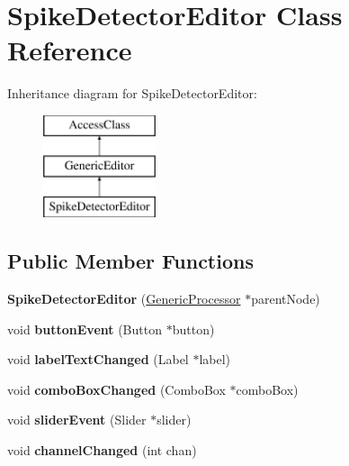 \hypertarget{classSpikeDetectorEditor}{\section{Spike\-Detector\-Editor Class Reference}
\label{classSpikeDetectorEditor}
}
Inheritance diagram for Spike\-Detector\-Editor\-:\begin{figure}[H]
\begin{center}
\leavevmode
\includegraphics[height=3.000000cm]{classSpikeDetectorEditor}
\end{center}
\end{figure}
\subsection*{Public Member Functions}
\begin{DoxyCompactItemize}
\item 
\hypertarget{classSpikeDetectorEditor_a5e291e45376684d6a7882962c9adbc1b}{{\bfseries Spike\-Detector\-Editor} (\hyperlink{classGenericProcessor}{Generic\-Processor} $\ast$parent\-Node)}\label{classSpikeDetectorEditor_a5e291e45376684d6a7882962c9adbc1b}

\item 
\hypertarget{classSpikeDetectorEditor_a3596a939b1842825ca19c7ba40c45214}{void {\bfseries button\-Event} (Button $\ast$button)}\label{classSpikeDetectorEditor_a3596a939b1842825ca19c7ba40c45214}

\item 
\hypertarget{classSpikeDetectorEditor_ae68515d9c025e06a5f8455a7afeed5bd}{void {\bfseries label\-Text\-Changed} (Label $\ast$label)}\label{classSpikeDetectorEditor_ae68515d9c025e06a5f8455a7afeed5bd}

\item 
\hypertarget{classSpikeDetectorEditor_aa989c11f9a1c54b9a8846512525fa756}{void {\bfseries combo\-Box\-Changed} (Combo\-Box $\ast$combo\-Box)}\label{classSpikeDetectorEditor_aa989c11f9a1c54b9a8846512525fa756}

\item 
\hypertarget{classSpikeDetectorEditor_af44153e6745ac264da123f8c3f97c805}{void {\bfseries slider\-Event} (Slider $\ast$slider)}\label{classSpikeDetectorEditor_af44153e6745ac264da123f8c3f97c805}

\item 
\hypertarget{classSpikeDetectorEditor_a24dcb89b8160a0ee92437ff45309abbb}{void {\bfseries channel\-Changed} (int chan)}\label{classSpikeDetectorEditor_a24dcb89b8160a0ee92437ff45309abbb}

\end{DoxyCompactItemize}
